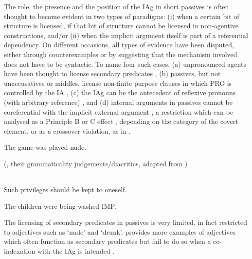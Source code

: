 \documentclass[output=paper]{langsci/langscibook}
\begin{document}
The role, the presence and the position of the \gls{IAg}
in short passives is often thought to become evident in two types of paradigms:
(i) when a certain bit of structure is licensed, if that bit of structure
cannot be licensed in non-agentive constructions, and/or (ii) when the implicit
argument itself is part of a referential dependency. On different occasions,
all types of evidence have been disputed, either through counterexamples or by
suggesting that the mechanism involved does not have to be syntactic. To name
four such cases, (a) unpronounced agents have been thought to license secondary
predicates , (b) passives, but not
unaccusatives or middles,
license non-finite purpose clauses in which PRO is controlled by the IA
, (c) the \gls{IAg} can be the
antecedent of reflexive pronouns (with arbitrary reference) ,
and (d) internal arguments in passives cannot be coreferential with the
implicit external argument , a restriction which can be
analysed as a Principle B or C effect \parencite{Kratzer1994,Kratzer2000},
depending on the category of the covert element, or as a crossover violation,
as in \citet{BakJohRob1989}.

\ea\label{ex:key:22.1}
    The game was played nude.
\z

\ea\label{ex:key:22.2} \citeauthor{BhattPancheva2006}
(\citeyear{BhattPancheva2006}, their grammaticality
judgements/diacritics, adapted from \citealt{Manzini1983})\\
    \z
\z

\ea\label{ex:key:22.3}\textcite[228]{BakJohRob1989}\\
    Such privileges should be kept to oneself.
\z

\ea\label{ex:key:22.4}
    The children were being washed IMP.
\z

The licensing of secondary predicates in  passives is very limited, in
fact restricted to adjectives such as ‘nude’ and ‘drunk’. \citet{Landau2010}
provides more examples of adjectives which often function as secondary
predicates but fail to do so when a co-indexation with the \gls{IAg} is intended
.
\end{document}
